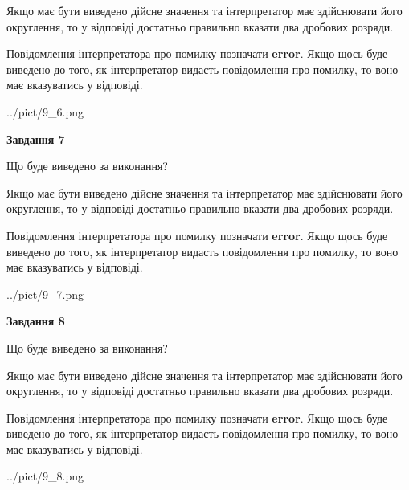 \documentclass[12pt, ukrainian]{article}
\begin{document}
{\begin {Large}
Якщо має бути виведено дійсне значення та інтерпретатор має здійснювати його округлення, 
то у відповіді достатньо правильно вказати два дробових розряди.

Повідомлення інтерпретатора про помилку позначати \textbf{error}.
Якщо щось буде виведено до того, як інтерпретатор видасть повідомлення про помилку, 
то воно має вказуватись у відповіді. \par

\begin{center}
	{../pict/9_6.png}
\end{center}
\newpage

{\begin {center}\textbf{Завдання 7}\end {center}}\par
Що буде виведено за виконання? \par

Якщо має бути виведено дійсне значення та інтерпретатор має здійснювати його округлення, 
то у відповіді достатньо правильно вказати два дробових розряди.

Повідомлення інтерпретатора про помилку позначати \textbf{error}.
Якщо щось буде виведено до того, як інтерпретатор видасть повідомлення про помилку, 
то воно має вказуватись у відповіді. \par

\begin{center}
	{../pict/9_7.png}
\end{center}
\newpage

{\begin {center}\textbf{Завдання 8}\end {center}}\par
Що буде виведено за виконання? \par

Якщо має бути виведено дійсне значення та інтерпретатор має здійснювати його округлення, 
то у відповіді достатньо правильно вказати два дробових розряди.

Повідомлення інтерпретатора про помилку позначати \textbf{error}.
Якщо щось буде виведено до того, як інтерпретатор видасть повідомлення про помилку, 
то воно має вказуватись у відповіді. \par

\begin{center}
	{../pict/9_8.png}
\end{center}
\newpage


\end{Large}}
\end{document}
